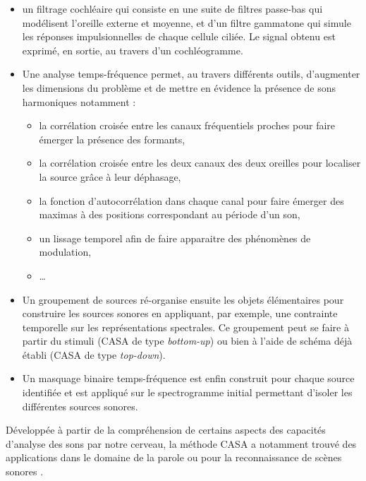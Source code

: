 \begin{itemize}
\item un filtrage cochléaire qui consiste en une suite de filtres passe-bas qui modélisent l'oreille externe et moyenne, et d'un filtre gammatone qui simule les réponses impulsionnelles de chaque cellule ciliée. Le signal obtenu est exprimé, en sortie, au travers d'un cochléogramme.
\item Une analyse temps-fréquence permet, au travers différents outils, d'augmenter les dimensions du problème et de mettre en évidence la présence de sons harmoniques notamment :
\begin{itemize}[label=$\bullet$]
\item la corrélation croisée entre les canaux fréquentiels proches pour faire émerger la présence des formants,
\item la corrélation croisée entre les deux canaux des deux oreilles pour localiser la source grâce à leur déphasage,
\item la fonction d'autocorrélation dans chaque canal pour faire émerger des maximas à des positions correspondant au période d'un son,
\item un lissage temporel afin de faire apparaitre des phénomènes de modulation,
\item \dots
\end{itemize}
\item Un groupement de sources ré-organise ensuite les objets élémentaires pour construire les sources sonores en appliquant, par exemple, une contrainte temporelle  sur les représentations spectrales. Ce groupement peut se faire à partir du stimuli (CASA de type \textit{bottom-up}) ou bien à l'aide de schéma déjà établi (CASA de type \textit{top-down}).
\item Un masquage binaire temps-fréquence est enfin construit pour chaque source identifiée et est appliqué sur le spectrogramme initial permettant d'isoler les différentes sources sonores.\\
\end{itemize}

Développée à partir de la compréhension de certains aspects des capacités d'analyse des sons par notre cerveau, la méthode CASA a notamment trouvé des applications dans le domaine de la parole \cite{ellis1999using, brown2005separation, shao2010computational} ou pour la reconnaissance de scènes sonores \cite{peltonen2002computational}. %

